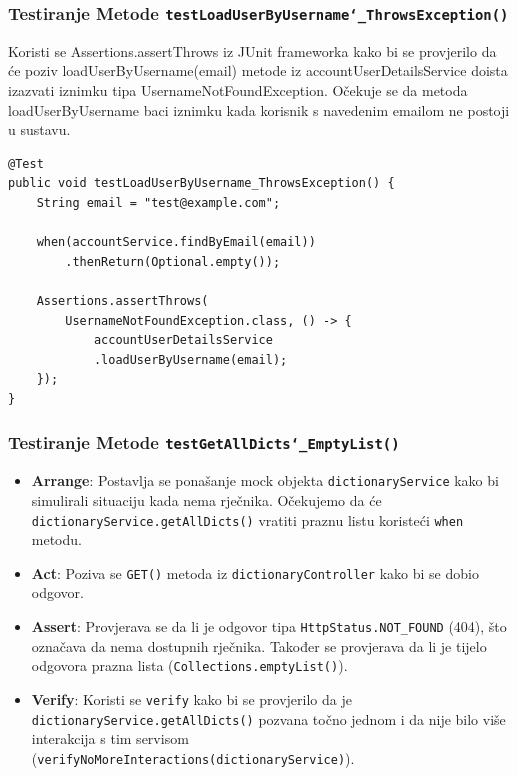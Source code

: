			\subsubsection{Testiranje Metode \texttt{testLoadUserByUsername\char`_ThrowsException()}}
			
			Koristi se Assertions.assertThrows iz JUnit frameworka kako bi se provjerilo da će poziv loadUserByUsername(email) metode iz accountUserDetailsService doista izazvati iznimku tipa UsernameNotFoundException. Očekuje se da metoda loadUserByUsername baci iznimku kada korisnik s navedenim emailom ne postoji u sustavu.
			
			\begin{lstlisting}
@Test
public void testLoadUserByUsername_ThrowsException() {
	String email = "test@example.com";
	
	when(accountService.findByEmail(email))
		.thenReturn(Optional.empty());
	
	Assertions.assertThrows(
		UsernameNotFoundException.class, () -> {
			accountUserDetailsService
			.loadUserByUsername(email);
	});
}
			\end{lstlisting}
			
			\subsubsection{Testiranje Metode \texttt{testGetAllDicts\char`_EmptyList()}}	
			
			\begin{itemize}
				\item \textbf{Arrange}: Postavlja se ponašanje mock objekta \texttt{dictionaryService} kako bi simulirali situaciju kada nema rječnika. Očekujemo da će \texttt{dictionaryService.getAllDicts()} vratiti praznu listu koristeći \texttt{when} metodu.
				
				\item \textbf{Act}: Poziva se \texttt{GET()} metoda iz \texttt{dictionaryController} kako bi se dobio odgovor.
				
				\item \textbf{Assert}: Provjerava se da li je odgovor tipa \texttt{HttpStatus.NOT\_FOUND} (404), što označava da nema dostupnih rječnika. Također se provjerava da li je tijelo odgovora prazna lista (\texttt{Collections.emptyList()}).
				
				\item \textbf{Verify}: Koristi se \texttt{verify} kako bi se provjerilo da je \texttt{dictionaryService.getAllDicts()} pozvana točno jednom i da nije bilo više interakcija s tim servisom \\(\texttt{verifyNoMoreInteractions(dictionaryService)}).
			\end{itemize}
			
